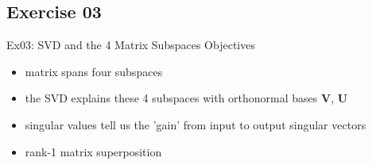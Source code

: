 \documentclass[mathserif, aspectratio=1610]{intbeamer}
\begin{document}
\subsection{Exercise 03}

\begin{frame}{Ex03: SVD and the 4 Matrix Subspaces}
Objectives
\begin{itemize}
\item matrix spans four subspaces
\item the SVD explains these 4 subspaces with orthonormal bases $\bm{V}$, $\bm{U}$
\item singular values tell us the 'gain' from input to output singular vectors
\item rank-1 matrix superposition
\end{itemize}
\end{frame}
\end{document}
